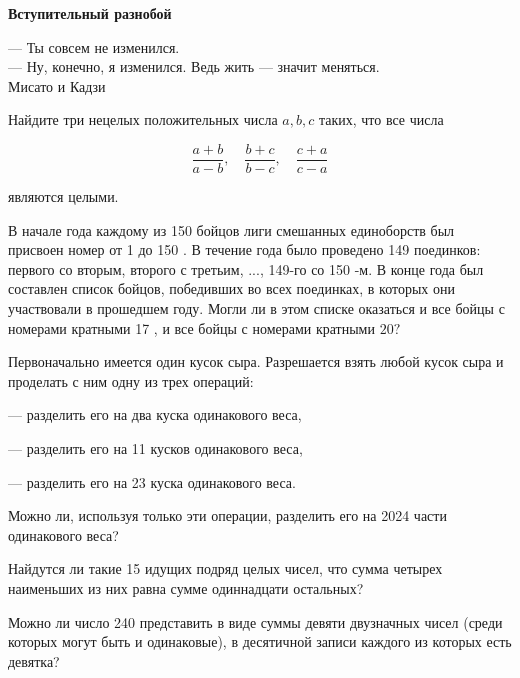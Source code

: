 \centerline{\bf \Huge Вступительный разнобой}

\begin{flushright}
        \scriptsize{— Ты совсем не изменился.\\— Ну, конечно, я изменился. Ведь жить — значит меняться.\\Мисато и Кадзи}
\end{flushright}

Найдите три нецелых положительных числа $a, b, c$ таких, что все числа

$$
\frac{a+b}{a-b}, \quad \frac{b+c}{b-c}, \quad \frac{c+a}{c-a}
$$

являются целыми.

В начале года каждому из 150 бойцов лиги смешанных единоборств был присвоен номер от 1 до 150 . В течение года было проведено 149 поединков: первого со вторым, второго с третьим, ..., 149-го со 150 -м. В конце года был составлен список бойцов, победивших во всех поединках, в которых они участвовали в прошедшем году. Могли ли в этом списке оказаться и все бойцы с номерами кратными 17 , и все бойцы с номерами кратными $20 ?$

Первоначально имеется один кусок сыра. Разрешается взять любой кусок сыра и проделать с ним одну из трех операций:

--- разделить его на два куска одинакового веса,

--- разделить его на 11 кусков одинакового веса,

--- разделить его на 23 куска одинакового веса.

Можно ли, используя только эти операции, разделить его на 2024 части одинакового веса?

Найдутся ли такие 15 идущих подряд целых чисел, что сумма четырех наименьших из них равна сумме одиннадцати остальных?

Можно ли число 240 представить в виде суммы девяти двузначных чисел (среди которых могут быть и одинаковые), в десятичной записи каждого из которых есть девятка?